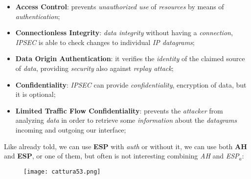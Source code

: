 \documentclass{article}
\begin{document}
\begin{itemize}
\item \textbf{Access Control}: prevents \emph{unauthorized use} of \emph{resources} by means of \emph{authentication};
\item \textbf{Connectionless Integrity}: \emph{data integrity} without having a \emph{connection}, \emph{IPSEC} is able to check changes to individual \emph{IP datagrams};
\item \textbf{Data Origin Authentication}: it verifies the \emph{identity} of the claimed source of \emph{data}, providing \emph{security} also against \emph{replay attack};
\item \textbf{Confidentiality}: \emph{IPSEC} can provide \emph{confidentiality}, encryption of data, but it is optional;
\item \textbf{Limited Traffic Flow Confidentiality}: prevents the \emph{attacker} from analyzing \emph{data} in order to retrieve some \emph{information} about the \emph{datagrams} incoming and outgoing our interface;
\end{itemize}
Like already told, we can use \textbf{ESP} with \emph{auth} or without it, we can use both \textbf{AH} and \textbf{ESP}, or one of them, but often is not interesting combining \emph{AH} and \emph{ESP}$_a$:
\begin{figure}[H]
  \centering
  \texttt{[image: cattura53.png]}
\end{figure}
\end{document}
